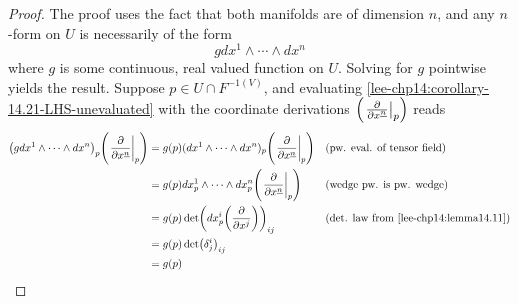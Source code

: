 \documentclass[../main-manifolds.tex]{subfiles}
\begin{document}
    \begin{proof}
        The proof uses the fact that both manifolds are of dimension $n$, and any $n$-form on $U$ is necessarily of the form
        \begin{equation}\label{lee-chp14:corollary-14.21-LHS-unevaluated}
            gdx^1\wedge\cdots\wedge dx^n
        \end{equation}
        where $g$ is some continuous, real valued function on $U$. Solving for $g$ pointwise yields the result. Suppose $p\in U\cap F^{-1(V)}$, and evaluating \cref{lee-chp14:corollary-14.21-LHS-unevaluated} with the coordinate derivations $\qty(\eval{\pdv{x^{\underline{n}}}}_p)$ reads
        \begin{align*}
            \qty(gdx^1\wedge\cdots\wedge dx^n)_p\qty(\eval{\pdv{x^{\underline{n}}}}_p) &= g(p)(dx^1\wedge\cdots\wedge dx^n)_p\qty(\eval{\pdv{x^{\underline{n}}}}_p) &&\text{(pw. eval. of tensor field)}\\
            &= g(p)dx^1_p\wedge\cdots\wedge dx^n_p\qty(\eval{\pdv{x^{\underline{n}}}}_p) && \text{(wedge pw. is pw. wedge)}\\
            &= g(p)\det(dx^i_p\qty(\pdv{x^j}))_{ij}&& \text{(det. law from \Cref{lee-chp14:lemma14.11})}\\
            &= g(p) \det(\delta^{i}_j)_{ij}\\
            &= g(p)
        \end{align*}
        

\end{proof}
\end{document}
